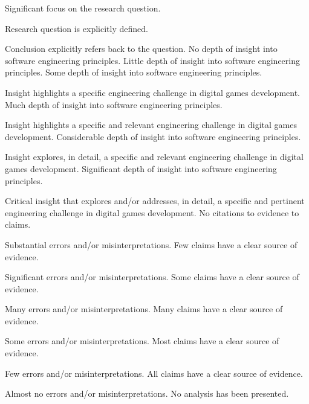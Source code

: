 \documentclass{../../fal_assignment}
\begin{document}
\begin{markingrubric}
        \grade 		Significant focus on the research question.
            \par 		Research question is explicitly defined.
            \par 		Conclusion explicitly refers back to the question.
%
        \grade\fail 	No depth of insight into software engineering principles.
        \grade 		Little depth of insight into software engineering principles.
        \grade 		Some depth of insight into software engineering principles.
        \par 		Insight highlights a specific engineering challenge in digital games development.
        \grade 		Much depth of insight into software engineering principles.
        \par 		Insight highlights a specific and relevant engineering challenge in digital games development.
        \grade 		Considerable depth of insight into software engineering principles.
        \par 		Insight explores, in detail, a specific and relevant engineering challenge in digital games development.
        \grade 		Significant depth of insight into software engineering principles.
        \par 		Critical insight that explores and/or addresses, in detail, a specific and pertinent engineering challenge in digital games development.
%
        \grade\fail 	No citations to evidence to claims.
        \par 		Substantial errors and/or misinterpretations.
        \grade 		Few claims have a clear source of evidence.
        \par 		Significant errors and/or misinterpretations.
        \grade 		Some claims have a clear source of evidence.
        \par 		Many errors and/or misinterpretations.
        \grade 		Many claims have a clear source of evidence.
        \par 		Some errors and/or misinterpretations.
        \grade 		Most claims have a clear source of evidence.
        \par 		Few errors and/or misinterpretations.
        \grade 		All claims have a clear source of evidence.
        \par 		Almost no errors and/or misinterpretations.
%
        \grade\fail 	No analysis has been presented.

\end{markingrubric}
\end{document}
